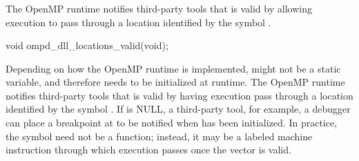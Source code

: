 \subsubsection{}
\label{subsubsec:ompd_dll_locations_valid}

\summary
The OpenMP runtime notifies third-party tools that 
is valid by allowing execution to pass through a location identified
by the symbol .


\begin{cspecific}
\begin{ompSyntax}
void ompd_dll_locations_valid(void);
\end{ompSyntax}
\end{cspecific}


\descr
Depending on how the OpenMP runtime is
implemented,  might not be a static
variable, and therefore needs to be initialized at runtime.  The
OpenMP runtime notifies third-party tools
that  is valid by having execution pass
through a location identified by the
symbol .
If  is NULL, a third-party tool, for example, a
debugger can place a breakpoint at 
to be notified when  has been initialized.
In practice, the symbol  need not be
a function; instead, it may be a labeled machine instruction through
which execution passes once the vector is valid.

